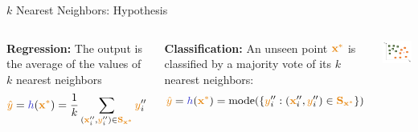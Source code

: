 \documentclass[aspectratio=169,10pt]{beamer}
\begin{document}
\begin{frame}{$k$ Nearest Neighbors: Hypothesis}
	\begin{columns}
		
		\pause
		\textbf{Regression: } The output is the average of the values of $k$ nearest neighbors 
					\begin{equation}
						\predy = \hypothesis(\unseenx) = \dfrac{1}{k}\sum_{(\boldx''_i, \smally''_i) \in \knnset_\unseenx} \smally''_i
					\end{equation}
		
		\pause
		\textbf{Classification:} An unseen point $\unseenx$ is classified by a majority vote of its $k$ nearest neighbors:
		\begin{equation}
			\predy = \hypothesis(\unseenx) = \text{mode}(\lbrace \smally''_i:(\boldx''_i, \smally''_i) \in \knnset_\unseenx \rbrace)
		\end{equation}
		
	
		\begin{center}
			\onslide
			\includegraphics[width=\linewidth, clip]{images/example_hypothesis}
		\end{center}
	\end{columns}
	
\end{frame}
\end{document}
